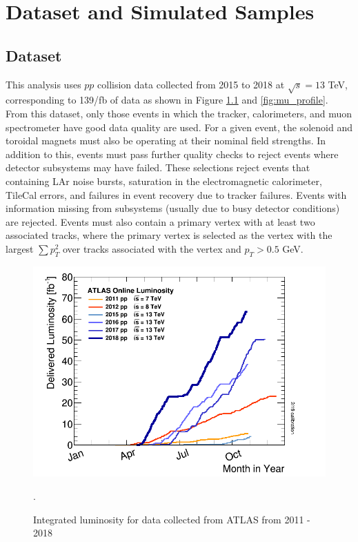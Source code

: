 \label{ch:analysis}
\chapter{Dataset and Simulated Samples}
\section{Dataset}
This analysis uses $pp$ collision data collected from 2015 to 2018 at $\sqrt{s}=13$ TeV, corresponding to 139/fb of data as shown in Figure \ref{fig:int_lumi} and \ref{fig:mu_profile}. From this dataset, only those events in which the tracker, calorimeters, and muon spectrometer have good data quality are used.  For a given event, the solenoid and toroidal magnets must also be operating at their nominal field strengths. In addition to this, events must pass further quality checks to reject events where detector subsystems may have failed. These selections reject events that containing LAr noise bursts, saturation in the electromagnetic calorimeter, TileCal errors, and failures in event recovery due to tracker failures. Events with information missing from subsystems (usually due to busy detector conditions) are rejected.  Events must also contain a primary vertex with at least two associated tracks, where the primary vertex is selected as the vertex with the largest $\sum p_{T}^{2}$ over tracks associated with the vertex and $p_{T}>0.5$ GeV.


\begin{figure}[h!]
  \centering
  \includegraphics[width=\hsize]{figures/Analysis/lumi.png}
  \caption{Integrated luminosity for data collected from ATLAS from 2011 - 2018}. 
  \label{fig:int_lumi}
\end{figure} 
\FloatBarrier

